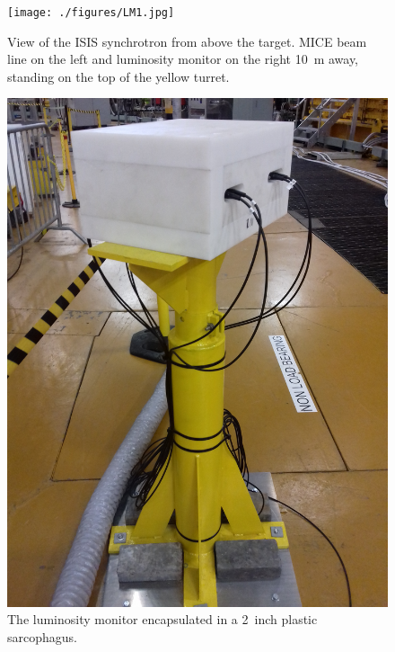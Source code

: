 \documentclass[a4paper,11pt]{article}
\begin{document}
\begin{figure}
  \begin{center}
    \texttt{[image: ./figures/LM1.jpg]}
    \caption{View of the ISIS synchrotron from above the target. MICE beam line on the left and luminosity monitor on the right 10~m away, standing on the top of the yellow turret.}
    \label{fig:LM1}
  \end{center}
\end{figure}

\begin{figure}
  \begin{center}
    \includegraphics[width=1.0\columnwidth]{./figures/LM4.jpg}
    \caption{The luminosity monitor encapsulated in a 2~inch plastic sarcophagus.}
    \label{fig:LM2}
  \end{center}
\end{figure}
\end{document}
